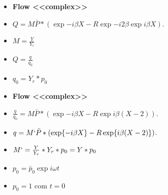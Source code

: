 \documentclass[10pt]{beamer}
\theoremstyle{remark}
\theoremstyle{definition}
\begin{document}
\begin{frame}[allowframebreaks]
\begin{itemize}
			
		\end{itemize}
		
		\framebreak
		
		\begin{itemize}
			\item \textbf{Flow <<complex>>}
			\item $ Q = M \bar{P} * (\exp{-i\beta X} - R\exp{-i2\beta}\exp{i\beta X})$.
			\item $ M = \frac{Y}{Y_r}$
			\item $ Q = \frac{q}{q_0}$
			\item $ q_0 = Y_r * p_0$
			
		\end{itemize}
		
		\framebreak
		
		\begin{itemize}
			\item \textbf{Flow <<complex>>}
			\item $ \frac{q}{q_0} = M \bar{P} * (\exp{-i\beta X} - R\exp{i\beta(X - 2)})$.
			\item $ q = M` \bar{P} * (\exp{-i\beta X} - R\exp{i\beta(X - 2)})$.
			\item $ M` = \frac{Y}{Y_r} * Y_r * p_0 = Y * p_0$
			\item $p_0 = \bar{p}_0 \exp{i\omega t}$
			\item $p_0 = 1$ com $t = 0$
			
		\end{itemize}
		
	\end{frame}
	
	
	
\end{document}
